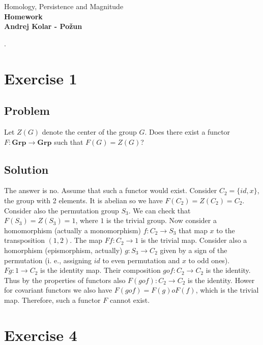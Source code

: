 \documentclass{article}
\begin{document}
\begin{titlepage}
    \begin{center}
        \vspace*{1cm}
        \Large
\vspace{3cm}
        Homology, Persistence and Magnitude\\
        \huge
        \textbf{Homework \\}
\Large  
        \vspace{1cm}
        \textbf{Andrej Kolar - Po{\v z}un\\}


\vfill
\normalsize
\end{center}. 
\end{titlepage}
\newpage
{}
\section*{Exercise 1}
\subsection*{Problem}
Let $Z(G)$ denote the center of the group $G$. Does there exist a functor $F: \mathbf{Grp} \to \mathbf{Grp}$ such that $F(G) = Z(G)$?
\subsection*{Solution}
The answer is no. Assume that such a functor would exist. Consider $C_2 = \{id, x\}$, the group with 2 elements. It is abelian so we have $F(C_2) = Z(C_2) = C_2$. Consider also the permutation group $S_3$. We can check that $F(S_3) = Z(S_3) = 1$, where $1$ is the trivial group.
Now consider a homomorphism (actually a monomorphism) $f: C_2 \to S_3$ that map $x$ to the transposition $(1,2)$.
The map $Ff: C_2 \to 1$ is the trivial map.
Consider also a homorphism (epismorphism, actually) $g: S_3 \to C_2$ given by a sign of the permutation (i. e., assigning $id$ to even permutation and $x$ to odd ones). $Fg: 1 \to C_2$ is the identity map.
Their composition $g o f : C_2 \to C_2$ is the identity. Thus by the properties of functors also $F(g o f) : C_2 \to C_2$ is the identity. Hower for covariant functors we also have $F(g o f) = F(g) o F(f)$, which is the trivial map. Therefore, such a functor $F$ cannot exist.


\section*{Exercise 4}
\end{document}
